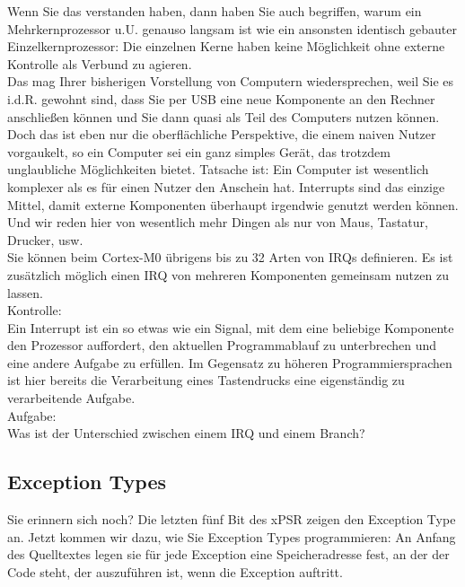 Wenn Sie das verstanden haben, dann haben Sie auch begriffen, warum ein Mehrkernprozessor u.U. genauso langsam ist wie ein ansonsten identisch gebauter Einzelkernprozessor: Die einzelnen Kerne haben keine Möglichkeit ohne externe Kontrolle als Verbund zu agieren.\\

Das mag Ihrer bisherigen Vorstellung von Computern wiedersprechen, weil Sie es i.d.R. gewohnt sind, dass Sie per USB eine neue Komponente an den Rechner anschließen können und Sie dann quasi als Teil des Computers nutzen können. Doch das ist eben nur die oberflächliche Perspektive, die einem naiven Nutzer vorgaukelt, so ein Computer sei ein ganz simples Gerät, das trotzdem unglaubliche Möglichkeiten bietet. Tatsache ist: Ein Computer ist wesentlich komplexer als es für einen Nutzer den Anschein hat. Interrupts sind das einzige Mittel, damit externe Komponenten überhaupt irgendwie genutzt werden können. Und wir reden hier von wesentlich mehr Dingen als nur von Maus, Tastatur, Drucker, usw.\\

Sie können beim Cortex-M0 übrigens bis zu 32 Arten von IRQs definieren. Es ist zusätzlich möglich einen IRQ von mehreren Komponenten gemeinsam nutzen zu lassen.\\

Kontrolle:\\

Ein Interrupt ist ein so etwas wie ein Signal, mit dem eine beliebige Komponente den Prozessor auffordert, den aktuellen Programmablauf zu unterbrechen und eine andere Aufgabe zu erfüllen. Im Gegensatz zu höheren Programmiersprachen ist hier bereits die Verarbeitung eines Tastendrucks eine eigenständig zu verarbeitende Aufgabe.\\

Aufgabe:\\

Was ist der Unterschied zwischen einem IRQ und einem Branch?

\subsection{Exception Types}

Sie erinnern sich noch? Die letzten fünf Bit des xPSR zeigen den Exception Type an. Jetzt kommen wir dazu, wie Sie Exception Types programmieren: An Anfang des Quelltextes legen sie für jede Exception eine Speicheradresse fest, an der der Code steht, der auszuführen ist, wenn die Exception auftritt.\\

